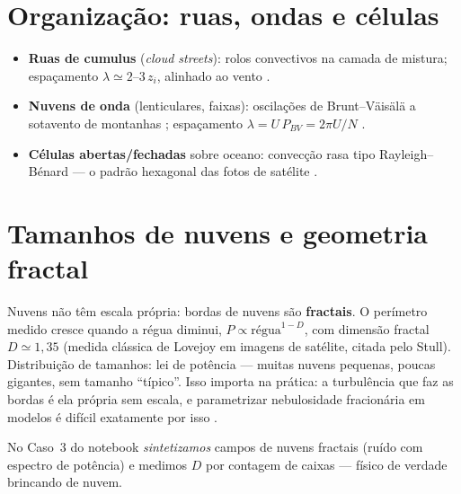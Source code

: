 \documentclass[11pt]{article}
\begin{document}
\section{Organização: ruas, ondas e células}\label{sec:organizacao}


\begin{itemize}
  \item \textbf{Ruas de cumulus} (\emph{cloud streets}): rolos
        convectivos na camada de mistura; espaçamento
        $\lambda \simeq 2$--$3\,z_i$, alinhado ao vento
        .
  \item \textbf{Nuvens de onda} (lenticulares, faixas): oscilações de
        Brunt--Väisälä a sotavento de montanhas
        ; espaçamento
        $\lambda = U\,P_{BV} = 2\pi U/N$ .
  \item \textbf{Células abertas/fechadas} sobre oceano: convecção rasa
        tipo Rayleigh--Bénard — o padrão hexagonal das fotos de
        satélite .
\end{itemize}

\section{Tamanhos de nuvens e geometria fractal}\label{sec:fractal}


Nuvens não têm escala própria: bordas de nuvens são \textbf{fractais}.
O perímetro medido cresce quando a régua diminui,
$P \propto \text{régua}^{1-D}$, com dimensão fractal $D \simeq 1{,}35$
(medida clássica de Lovejoy em imagens de satélite, citada pelo Stull).
Distribuição de tamanhos: lei de potência — muitas nuvens pequenas,
poucas gigantes, sem tamanho ``típico''. Isso importa na prática: a
turbulência que faz as bordas  é ela
própria sem escala, e parametrizar nebulosidade fracionária em modelos é
difícil exatamente por isso .

No Caso~3 do notebook \emph{sintetizamos} campos de nuvens fractais
(ruído com espectro de potência) e medimos $D$ por contagem de caixas —
físico de verdade brincando de nuvem.
\end{document}

